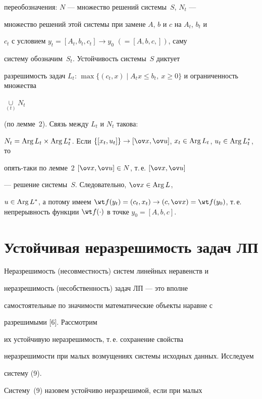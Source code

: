 переобозначения: $N$ --- множество решений системы~$S$, $N_t$ ---


множество решений этой системы при замене $A$, $b$ и $c$ на $A_t$, $b_t$ и


$c_t$ с условием $y_t=[A_t,b_t,c_t]\to y_0$ $(=[A,b,c,])$, саму


систему обозначим~$S_t$. Устойчивость системы~$S$ диктует


разрешимость задач $L_t:\, \max\{(c_t,x) \mid A_tx\leq b_t,\


x\geq 0\}$ и ограниченность множества


$\mathop{\cup}\limits_{(t)}N_t$


(по лемме~2). Связь между $L_t$ и $N_t$ такова:


$N_t=\Arg L_t\times\Arg L_t^*$. Если $\{[x_t,u_t]\}\to[\ov


x,\ov u]$, $x_t\in\Arg L_t$, $u_t\in\Arg L_t^*$, то


опять-таки по лемме~2\; $[\ov x, \ov u]\in N$, т.\,е. $[\ov x, \ov u]$


--- решение системы~$S$. Следовательно, $\ov x\in\Arg L$,


$u\in\Arg L^*$, а потому имеем $\wt f(y_t) = (c_t,x_t)\to


(c,\ov x)=\wt f(y_0)$, т.\,е. непрерывность функции $\wt


f(\cdot)$ в точке $y_0=[A,b,c]$.





\section{Устойчивая неразрешимость задач ЛП}





Неразрешимость (несовместность) систем линейных неравенств и


неразрешимость (несобственность) задач ЛП --- это вполне


самостоятельные по значимости математические объекты наравне с


разрешимыми [6]. Рассмотрим


их устойчивую неразрешимость, т.\,е. сохранение свойства


неразрешимости при малых возмущениях системы исходных данных. Исследуем


систему (9).


Систему~(9) назовем устойчиво неразрешимой, если при малых


